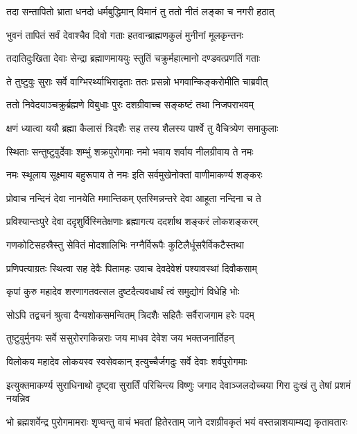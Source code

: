 \twolineshloka
{तदा सन्तापितो भ्राता धनदो धर्मबुद्धिमान्}
{विमानं तु ततो नीतं लङ्का च नगरी हठात्}%

\twolineshloka
{भुवनं तापितं सर्वं देवाश्चैव दिवो गताः}
{हतवान्ब्राह्मणकुलं मुनीनां मूलकृन्तनः}%

\twolineshloka
{तदातिदुःखिता देवाः सेन्द्रा ब्रह्माणमाययुः}
{स्तुतिं चक्रुर्महात्मानो दण्डवत्प्रणतिं गताः}%

\twolineshloka
{ते तुष्टुवुः सुराः सर्वे वाग्भिरर्थ्याभिरादृताः}
{ततः प्रसन्नो भगवान्किङ्करोमीति चाब्रवीत्}%

\twolineshloka
{ततो निवेदयाञ्चक्रुर्ब्रह्मणे विबुधाः पुरः}
{दशग्रीवाच्च सङ्कष्टं तथा निजपराभवम्}%

\twolineshloka
{क्षणं ध्यात्वा ययौ ब्रह्मा कैलासं त्रिदशैः सह}
{तस्य शैलस्य पार्श्वे तु वैचित्र्येण समाकुलाः}%

\twolineshloka
{स्थिताः सन्तुष्टुवुर्देवाः शम्भुं शक्रपुरोगमाः}
{नमो भवाय शर्वाय नीलग्रीवाय ते नमः}%

\twolineshloka
{नमः स्थूलाय सूक्ष्माय बहुरूपाय ते नमः}
{इति सर्वमुखेनोक्तां वाणीमाकर्ण्य शङ्करः}%

\twolineshloka
{प्रोवाच नन्दिनं देवा नानयेति ममान्तिकम्}
{एतस्मिन्नन्तरे देवा आहूता नन्दिना च ते}%

\twolineshloka
{प्रविश्यान्तःपुरे देवा ददृशुर्विस्मितेक्षणाः}
{ब्रह्मागत्य ददर्शाथ शङ्करं लोकशङ्करम्}%

\twolineshloka
{गणकोटिसहस्रैस्तु सेवितं मोदशालिभिः}
{नग्नैर्विरूपैः कुटिलैर्धूसरैर्विकटैस्तथा}%

\twolineshloka
{प्रणिपत्याग्रतः स्थित्वा सह देवैः पितामहः}
{उवाच देवदेवेशं पश्यावस्थां दिवौकसाम्}%

\twolineshloka
{कृपां कुरु महादेव शरणागतवत्सल}
{दुष्टदैत्यवधार्थं त्वं समुद्योगं विधेहि भोः}%

\twolineshloka
{सोऽपि तद्वचनं श्रुत्वा दैन्यशोकसमन्वितम्}
{त्रिदशैः सहितैः सर्वैराजगाम हरेः पदम्}%

\twolineshloka
{तुष्टुवुर्मुनयः सर्वे ससुरोरगकिन्नराः}
{जय माधव देवेश जय भक्तजनार्तिहन्}%

\twolineshloka
{विलोकय महादेव लोकयस्व स्वसेवकान्}
{इत्युच्चैर्जगदुः सर्वे देवाः शर्वपुरोगमाः}%

\twolineshloka
{इत्युक्तमाकर्ण्य सुराधिनाथो दृष्ट्वा सुरार्तिं परिचिन्त्य विष्णुः}
{जगाद देवाञ्जलदोच्चया गिरा दुःखं तु तेषां प्रशमं नयन्निव}%

\twolineshloka
{भो ब्रह्मशर्वेन्द्र पुरोगमामराः शृण्वन्तु वाचं भवतां हितेरताम्}
{जाने दशग्रीवकृतं भयं वस्तन्नाशयाम्यद्य कृतावतारः}%

